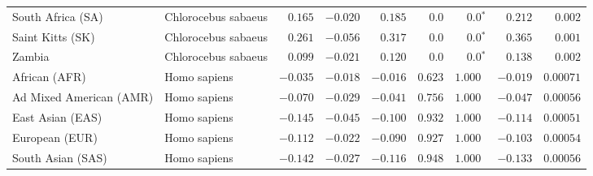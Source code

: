 \begin{center}
\begin{adjustbox}{width = 1\textwidth}
\begin{tabular}{|l|l|r|r|r|r|r|r|r|}
              South Africa (SA) &  Chlorocebus sabaeus &                                        $ 0.165$ &                                           $-0.020$ &                      $ 0.185$ &            $0.0$ &                  $\bm{0.0{^*}}$ &                                           $ 0.212$ &           $ 0.002$ \\
               Saint Kitts (SK) &  Chlorocebus sabaeus &                                        $ 0.261$ &                                           $-0.056$ &                      $ 0.317$ &            $0.0$ &                  $\bm{0.0{^*}}$ &                                           $ 0.365$ &           $ 0.001$ \\
                         Zambia &  Chlorocebus sabaeus &                                        $ 0.099$ &                                           $-0.021$ &                      $ 0.120$ &            $0.0$ &                  $\bm{0.0{^*}}$ &                                           $ 0.138$ &           $ 0.002$ \\
                  African (AFR) &         Homo sapiens &                                        $-0.035$ &                                           $-0.018$ &                      $-0.016$ &         $ 0.623$ &                      $ 1.000~~$ &                                           $-0.019$ &          $0.00071$ \\
        Ad Mixed American (AMR) &         Homo sapiens &                                        $-0.070$ &                                           $-0.029$ &                      $-0.041$ &         $ 0.756$ &                      $ 1.000~~$ &                                           $-0.047$ &          $0.00056$ \\
               East Asian (EAS) &         Homo sapiens &                                        $-0.145$ &                                           $-0.045$ &                      $-0.100$ &         $ 0.932$ &                      $ 1.000~~$ &                                           $-0.114$ &          $0.00051$ \\
                 European (EUR) &         Homo sapiens &                                        $-0.112$ &                                           $-0.022$ &                      $-0.090$ &         $ 0.927$ &                      $ 1.000~~$ &                                           $-0.103$ &          $0.00054$ \\
              South Asian (SAS) &         Homo sapiens &                                        $-0.142$ &                                           $-0.027$ &                      $-0.116$ &         $ 0.948$ &                      $ 1.000~~$ &                                           $-0.133$ &          $0.00056$ \\

\end{tabular}
\end{adjustbox}
\end{center}
